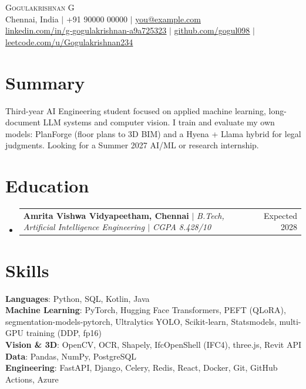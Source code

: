 \documentclass[a4paper,10pt]{article}
\makeatletter
\newcommand{\resumeProjectHeading}[2]{
  \item
  \begin{tabular*}{\textwidth}{l@{\extracolsep{\fill}}r}
    \small#1 & \small#2 \\
  \end{tabular*}\vspace{-6pt}
}
\newcommand{\resumeSubHeadingListStart}{\begin{itemize}[leftmargin=0in, label={}]}
\newcommand{\resumeSubHeadingListEnd}{\end{itemize}}
\makeatother
\begin{document}
\begin{center}
    {\Huge \scshape Gogulakrishnan G} \\ \vspace{2pt}
    \small Chennai, India $|$ +91 90000 00000 $|$
    \href{mailto:you@example.com}{you@example.com} \\
    \href{https://www.linkedin.com/in/g-gogulakrishnan-a9a725323/}{\underline{linkedin.com/in/g-gogulakrishnan-a9a725323}} $|$
    \href{https://github.com/gogul098}{\underline{github.com/gogul098}} $|$
    \href{https://leetcode.com/u/Gogulakrishnan234/}{\underline{leetcode.com/u/Gogulakrishnan234}}
\end{center}

\section{Summary}
\small{Third-year AI Engineering student focused on applied machine learning, long-document LLM systems and computer vision. I train and evaluate my own models: PlanForge (floor plans to 3D BIM) and a Hyena + Llama hybrid for legal judgments. Looking for a Summer 2027 AI/ML or research internship.}

\section{Education}
  \resumeSubHeadingListStart
    \resumeProjectHeading
      {\textbf{Amrita Vishwa Vidyapeetham, Chennai} $|$ \emph{B.Tech, Artificial Intelligence Engineering $|$ CGPA 8.428/10}}{Expected 2028}
  \resumeSubHeadingListEnd

\section{Skills}
 \begin{itemize}[leftmargin=0in, label={}]
    \small{\item{
     \textbf{Languages}{: Python, SQL, Kotlin, Java} \\
     \textbf{Machine Learning}{: PyTorch, Hugging Face Transformers, PEFT (QLoRA), segmentation-models-pytorch, Ultralytics YOLO, Scikit-learn, Statsmodels, multi-GPU training (DDP, fp16)} \\
     \textbf{Vision \& 3D}{: OpenCV, OCR, Shapely, IfcOpenShell (IFC4), three.js, Revit API} \\
     \textbf{Data}{: Pandas, NumPy, PostgreSQL} \\
     \textbf{Engineering}{: FastAPI, Django, Celery, Redis, React, Docker, Git, GitHub Actions, Azure}
    }}
 \end{itemize}
\end{document}
